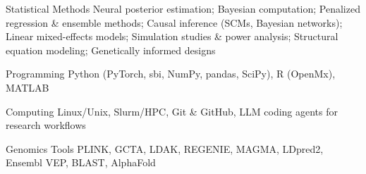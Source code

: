 
\begin{cvskills}
  \cvskill
    {Statistical Methods} %
    {Neural posterior estimation; Bayesian computation; Penalized regression \& ensemble methods; Causal inference (SCMs, Bayesian networks); Linear mixed-effects models; Simulation studies \& power analysis; Structural equation modeling; Genetically informed designs} %

  \cvskill
    {Programming} %
    {Python (PyTorch, sbi, NumPy, pandas, SciPy), R (OpenMx), MATLAB} %

  \cvskill
    {Computing} %
    {Linux/Unix, Slurm/HPC, Git \& GitHub, LLM coding agents for research workflows} %

  \cvskill
    {Genomics Tools} %
    {PLINK, GCTA, LDAK, REGENIE, MAGMA, LDpred2, Ensembl VEP, BLAST, AlphaFold} %


    



\end{cvskills}
